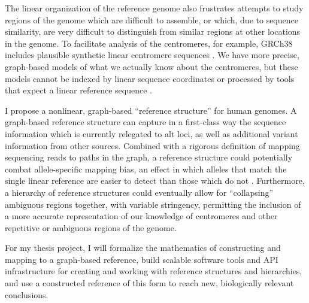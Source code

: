 \documentclass[11pt,proposal]{ucthesis}
\begin{document}

The linear organization of the reference genome also frustrates attempts to study regions of the genome which are difficult to assemble, or which, due to sequence similarity, are very difficult to distinguish from similar regions at other locations in the genome. To facilitate analysis of the centromeres, for example, GRCh38 includes plausible synthetic linear centromere sequences \cite{karolchik2014new}. We have more precise, graph-based models of what we actually know about the centromeres, but these models cannot be indexed by linear sequence coordinates or processed by tools that expect a linear reference sequence \cite{miga2014centromere}.

I propose a nonlinear, graph-based ``reference structure'' for human genomes. A graph-based reference structure can capture in a first-class way the sequence information which is currently relegated to alt loci, as well as additional variant information from other sources. Combined with a rigorous definition of mapping sequencing reads to paths in the graph, a reference structure could potentially combat allele-specific mapping bias, an effect in which alleles that match the single linear reference are easier to detect than those which do not \cite{degner2009effect}. Furthermore, a hierarchy of reference structures could eventually allow for ``collapsing'' ambiguous regions together, with variable stringency, permitting the inclusion of a more accurate representation of our knowledge of centromeres and other repetitive or ambiguous regions of the genome.

For my thesis project, I will formalize the mathematics of constructing and mapping to a graph-based reference, build scalable software tools and API infrastructure for creating and working with reference structures and hierarchies, and use a constructed reference of this form to reach new, biologically relevant conclusions.


    
    
    

    
\end{document}
